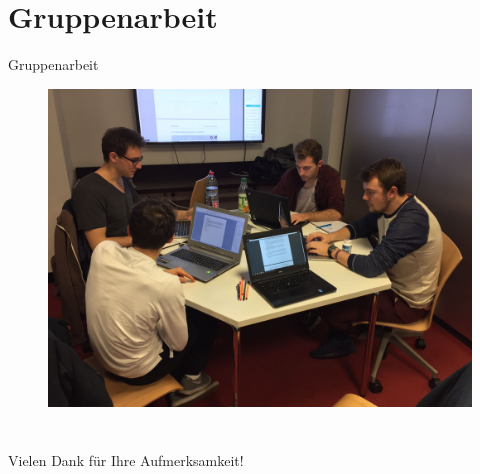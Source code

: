 \documentclass[19pt]{beamer}
\begin{document}
\section{Gruppenarbeit}
\begin{frame}{Gruppenarbeit}
	\begin{figure}
		\begin{center}
			\includegraphics[scale=0.16]{logos/Gruppenarbeit} 
		\end{center}
	\end{figure}	
\end{frame}

\section{}
\begin{frame}
	\begin{center}
 		Vielen Dank f\"ur Ihre Aufmerksamkeit!
	\end	{center} 	
\end{frame}
\end{document}
